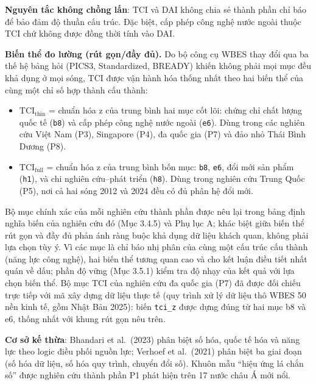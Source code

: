 \documentclass[
  a4paper,
  13pt]{extreport}
\providecommand{\tightlist}{%
  \setlength{\itemsep}{0pt}\setlength{\parskip}{0pt}}
\begin{document}
\textbf{Nguyên tắc không chồng lấn}: TCI và DAI không chia sẻ thành phần
chỉ báo để bảo đảm độ thuần cấu trúc. Đặc biệt, cấp phép công nghệ nước
ngoài thuộc TCI chứ không được đồng thời tính vào DAI.

\textbf{Biến thể đo lường (rút gọn/đầy đủ).} Do bộ công cụ WBES thay đổi
qua ba thế hệ bảng hỏi (PICS3, Standardized, BREADY) khiến không phải
mọi mục đều khả dụng ở mọi sóng, TCI được vận hành hóa thống nhất theo
hai biến thể của cùng một chỉ số hợp thành cấu thành:

\begin{itemize}
\tightlist
\item
  \(\mathrm{TCI}_{\text{thin}}\) = chuẩn hóa z của trung bình hai mục
  cốt lõi: chứng chỉ chất lượng quốc tế (\texttt{b8}) và cấp phép công
  nghệ nước ngoài (\texttt{e6}). Dùng trong các nghiên cứu Việt Nam
  (P3), Singapore (P4), đa quốc gia (P7) và đảo nhỏ Thái Bình Dương
  (P8).
\item
  \(\mathrm{TCI}_{\text{full}}\) = chuẩn hóa z của trung bình bốn mục:
  \texttt{b8}, \texttt{e6}, đổi mới sản phẩm (\texttt{h1}), và chi
  nghiên cứu--phát triển (\texttt{h8}). Dùng trong nghiên cứu Trung Quốc
  (P5), nơi cả hai sóng 2012 và 2024 đều có đủ phân hệ đổi mới.
\end{itemize}

Bộ mục chính xác của mỗi nghiên cứu thành phần được nêu lại trong bảng
định nghĩa biến của nghiên cứu đó (Mục 3.4.5) và Phụ lục A; khác biệt
giữa biến thể rút gọn và đầy đủ phản ánh ràng buộc khả dụng dữ liệu
khách quan, không phải lựa chọn tùy ý. Vì các mục là chỉ báo nhị phân
của cùng một cấu trúc cấu thành (năng lực công nghệ), hai biến thể tương
quan cao và cho kết luận điều tiết nhất quán về dấu; phần độ vững (Mục
3.5.1) kiểm tra độ nhạy của kết quả với lựa chọn biến thể. Bộ mục TCI
của nghiên cứu đa quốc gia (P7) đã được đối chiếu trực tiếp với mã xây
dựng dữ liệu thực tế (quy trình xử lý dữ liệu thô WBES 50 nền kinh tế,
gồm Nhật Bản 2025): biến \texttt{tci\_z} được dựng đúng từ hai mục b8 và
e6, thống nhất với khung rút gọn nêu trên.

\textbf{Cơ sở kế thừa}: Bhandari et al.~(2023) phân biệt số hóa, quốc tế
hóa và năng lực theo logic điều phối nguồn lực; Verhoef et al.~(2021)
phân biệt ba giai đoạn (số hóa dữ liệu, số hóa quy trình, chuyển đổi
số). Khuôn mẫu ``hiệu ứng lá chắn số'' được nghiên cứu thành phần P1
phát hiện trên 17 nước châu Á mới nổi.
\end{document}
